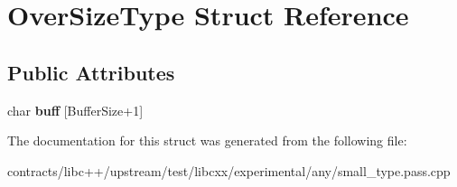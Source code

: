 \hypertarget{struct_over_size_type}{}\section{Over\+Size\+Type Struct Reference}
\label{struct_over_size_type}
\subsection*{Public Attributes}
\begin{DoxyCompactItemize}
\item 
\mbox{\label{struct_over_size_type_a98eb18f5b310775054e9aaa4511636d4}} 
char {\bfseries buff} \mbox{[}Buffer\+Size+1\mbox{]}
\end{DoxyCompactItemize}


The documentation for this struct was generated from the following file\+:\begin{DoxyCompactItemize}
\item 
contracts/libc++/upstream/test/libcxx/experimental/any/small\+\_\+type.\+pass.\+cpp\end{DoxyCompactItemize}
